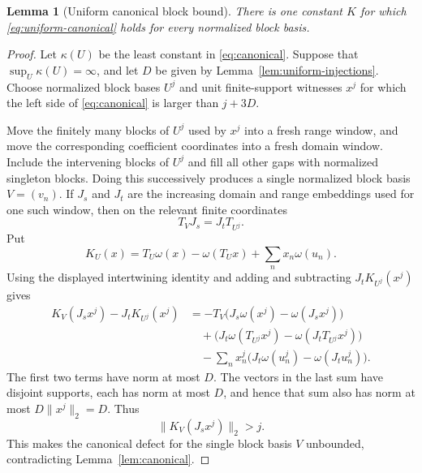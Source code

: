 \documentclass[11pt]{article}
\newtheorem{lemma}[theorem]{Lemma}
\begin{document}
\begin{lemma}[Uniform canonical block bound]
\label{lem:uniform-canonical}
There is one constant $K$ for which \eqref{eq:uniform-canonical} holds for
every normalized block basis.
\end{lemma}

\begin{proof}
Let $\kappa(U)$ be the least constant in \eqref{eq:canonical}.  Suppose that
$\sup_U\kappa(U)=\infty$, and let $D$ be given by
Lemma~\ref{lem:uniform-injections}.  Choose normalized block bases $U^j$ and
unit finite-support witnesses $x^j$ for which the left side of
\eqref{eq:canonical} is larger than $j+3D$.

Move the finitely many blocks of $U^j$ used by $x^j$ into a fresh range
window, and move the corresponding coefficient coordinates into a fresh
domain window.  Include the intervening blocks of $U^j$ and fill all other
gaps with normalized singleton blocks.  Doing this successively produces a
single normalized block basis $V=(v_n)$.  If $J_s$ and $J_t$ are the
increasing domain and range embeddings used for one such window, then on the
relevant finite coordinates
\[
 T_VJ_s=J_tT_{U^j}.
\]
Put
\[
 K_U(x)=T_U\omega(x)-\omega(T_Ux)+\sum_nx_n\omega(u_n).
\]
Using the displayed intertwining identity and adding and subtracting
$J_tK_{U^j}(x^j)$ gives
\begin{align*}
 K_V(J_sx^j)-J_tK_{U^j}(x^j)
 &=-T_V\big(J_s\omega(x^j)-\omega(J_sx^j)\big)\\
 &\quad+\big(J_t\omega(T_{U^j}x^j)
                   -\omega(J_tT_{U^j}x^j)\big)\\
 &\quad-\sum_nx_n^j
       \big(J_t\omega(u_n^j)-\omega(J_tu_n^j)\big).
\end{align*}
The first two terms have norm at most $D$.  The vectors in the last sum have
disjoint supports, each has norm at most $D$, and hence that sum also has norm
at most $D\|x^j\|_2=D$.  Thus
\[
 \|K_V(J_sx^j)\|_2>j.
\]
This makes the canonical defect for the single block basis $V$ unbounded,
contradicting Lemma~\ref{lem:canonical}.
\end{proof}
\end{document}
